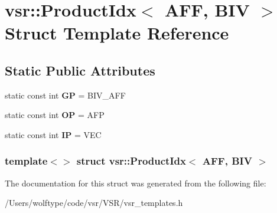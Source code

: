 \hypertarget{structvsr_1_1_product_idx_3_01_a_f_f_00_01_b_i_v_01_4}{\section{vsr\-:\-:Product\-Idx$<$ A\-F\-F, B\-I\-V $>$ Struct Template Reference}
\label{structvsr_1_1_product_idx_3_01_a_f_f_00_01_b_i_v_01_4}
}
\subsection*{Static Public Attributes}
\begin{DoxyCompactItemize}
\item 
\hypertarget{structvsr_1_1_product_idx_3_01_a_f_f_00_01_b_i_v_01_4_af2146d75840ca121eef39e5f4aa76f0d}{static const int {\bfseries G\-P} = B\-I\-V\-\_\-\-A\-F\-F}\label{structvsr_1_1_product_idx_3_01_a_f_f_00_01_b_i_v_01_4_af2146d75840ca121eef39e5f4aa76f0d}

\item 
\hypertarget{structvsr_1_1_product_idx_3_01_a_f_f_00_01_b_i_v_01_4_abacf6b5c03ef02464a58fd1384945ef0}{static const int {\bfseries O\-P} = A\-F\-P}\label{structvsr_1_1_product_idx_3_01_a_f_f_00_01_b_i_v_01_4_abacf6b5c03ef02464a58fd1384945ef0}

\item 
\hypertarget{structvsr_1_1_product_idx_3_01_a_f_f_00_01_b_i_v_01_4_a26830c1a1142a3a4e42420c6348af3aa}{static const int {\bfseries I\-P} = V\-E\-C}\label{structvsr_1_1_product_idx_3_01_a_f_f_00_01_b_i_v_01_4_a26830c1a1142a3a4e42420c6348af3aa}

\end{DoxyCompactItemize}
\subsubsection*{template$<$$>$ struct vsr\-::\-Product\-Idx$<$ A\-F\-F, B\-I\-V $>$}



The documentation for this struct was generated from the following file\-:\begin{DoxyCompactItemize}
\item 
/\-Users/wolftype/code/vsr/\-V\-S\-R/vsr\-\_\-templates.\-h\end{DoxyCompactItemize}
